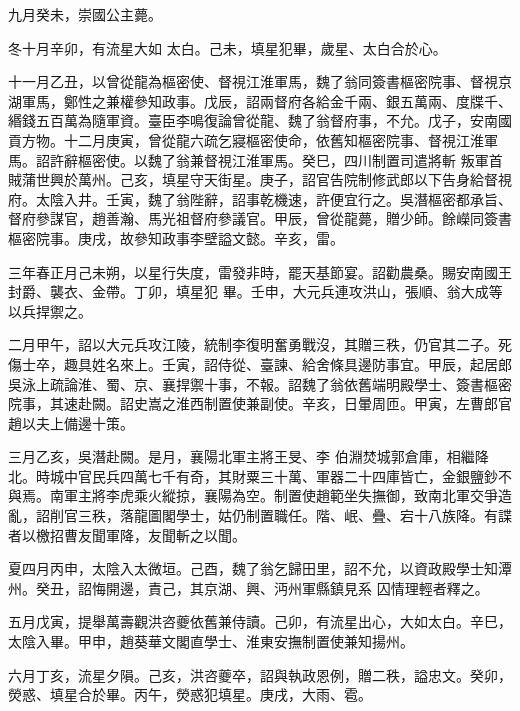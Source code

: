 \begin{pinyinscope}
 九月癸未，崇國公主薨。



 冬十月辛卯，有流星大如
 太白。己未，填星犯畢，歲星、太白合於心。



 十一月乙丑，以曾從龍為樞密使、督視江淮軍馬，魏了翁同簽書樞密院事、督視京湖軍馬，鄭性之兼權參知政事。戊辰，詔兩督府各給金千兩、銀五萬兩、度牒千、緡錢五百萬為隨軍資。臺臣李鳴復論曾從龍、魏了翁督府事，不允。戊子，安南國貢方物。十二月庚寅，曾從龍六疏乞寢樞密使命，依舊知樞密院事、督視江淮軍馬。詔許辭樞密使。以魏了翁兼督視江淮軍馬。癸巳，四川制置司遣將斬
 叛軍首賊蒲世興於萬州。己亥，填星守天街星。庚子，詔官告院制修武郎以下告身給督視府。太陰入井。壬寅，魏了翁陛辭，詔事乾機速，許便宜行之。吳潛樞密都承旨、督府參謀官，趙善瀚、馬光祖督府參議官。甲辰，曾從龍薨，贈少師。餘嶸同簽書樞密院事。庚戌，故參知政事李壁謚文懿。辛亥，雷。



 三年春正月己未朔，以星行失度，雷發非時，罷天基節宴。詔勸農桑。賜安南國王封爵、襲衣、金帶。丁卯，填星犯
 畢。壬申，大元兵連攻洪山，張順、翁大成等以兵捍禦之。



 二月甲午，詔以大元兵攻江陵，統制李復明奮勇戰沒，其贈三秩，仍官其二子。死傷士卒，趣具姓名來上。壬寅，詔侍從、臺諫、給舍條具邊防事宜。甲辰，起居郎吳泳上疏論淮、蜀、京、襄捍禦十事，不報。詔魏了翁依舊端明殿學士、簽書樞密院事，其速赴闕。詔史嵩之淮西制置使兼副使。辛亥，日暈周匝。甲寅，左曹郎官趙以夫上備邊十策。



 三月乙亥，吳潛赴闕。是月，襄陽北軍主將王旻、李
 伯淵焚城郭倉庫，相繼降北。時城中官民兵四萬七千有奇，其財粟三十萬、軍器二十四庫皆亡，金銀鹽鈔不與焉。南軍主將李虎乘火縱掠，襄陽為空。制置使趙範坐失撫御，致南北軍交爭造亂，詔削官三秩，落龍圖閣學士，姑仍制置職任。階、岷、疊、宕十八族降。有諜者以檄招曹友聞軍降，友聞斬之以聞。



 夏四月丙申，太陰入太微垣。己酉，魏了翁乞歸田里，詔不允，以資政殿學士知潭州。癸丑，詔悔開邊，責己，其京湖、興、沔州軍縣鎮見系
 囚情理輕者釋之。



 五月戊寅，提舉萬壽觀洪咨夔依舊兼侍讀。己卯，有流星出心，大如太白。辛巳，太陰入畢。甲申，趙葵華文閣直學士、淮東安撫制置使兼知揚州。



 六月丁亥，流星夕隕。己亥，洪咨夔卒，詔與執政恩例，贈二秩，謚忠文。癸卯，熒惑、填星合於畢。丙午，熒惑犯填星。庚戌，大雨、雹。




\end{pinyinscope}
